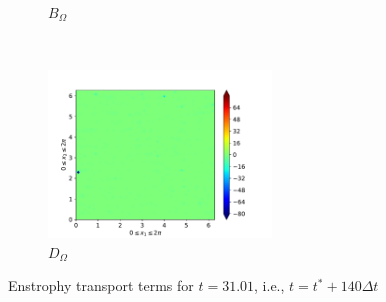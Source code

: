 \begin{figure}[H]
\begin{subfigure}{0.45\textwidth}
        \caption{$B_{\Omega}$}
    \end{subfigure}
    ~
    \begin{subfigure}{0.45\textwidth}
        \includegraphics[height=1.75in]{media/run-cds-65/D-enst-1480}
        \caption{$D_{\Omega}$}
    \end{subfigure}
    \caption{Enstrophy transport terms for $t=31.01$, i.e., $t=t^{\ast} + 140 \Delta t$}
\end{figure}

\newpage

